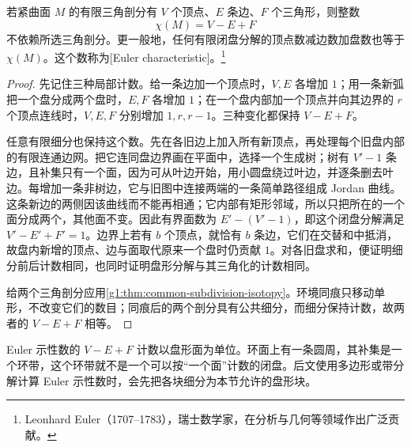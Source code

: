 \begin{proposition}\label{g1:prop:euler-triangulation-independent}
	若紧曲面 \(M\) 的有限三角剖分有 \(V\) 个顶点、\(E\) 条边、\(F\) 个三角形，则整数
	\[
	\chi(M)=V-E+F
	\]
	不依赖所选三角剖分。更一般地，任何有限闭盘分解的顶点数减边数加盘数也等于 \(\chi(M)\)。这个数称为[Euler characteristic]。\footnote{Leonhard Euler（1707--1783），瑞士数学家，在分析与几何等领域作出广泛贡献。}
\end{proposition}

\begin{proof}
	先记住三种局部计数。给一条边加一个顶点时，\(V,E\) 各增加 \(1\)；用一条新弧把一个盘分成两个盘时，\(E,F\) 各增加 \(1\)；在一个盘内部加一个顶点并向其边界的 \(r\) 个顶点连线时，\(V,E,F\) 分别增加 \(1,r,r-1\)。三种变化都保持 \(V-E+F\)。

	任意有限细分也保持这个数。先在各旧边上加入所有新顶点，再处理每个旧盘内部的有限连通边网。把它连同盘边界画在平面中，选择一个生成树；树有 \(V'-1\) 条边，且补集只有一个面，因为可从叶边开始，用小圆盘绕过叶边，并逐条删去叶边。每增加一条非树边，它与旧图中连接两端的一条简单路径组成 Jordan 曲线。这条新边的两侧因该曲线而不能再相通；它内部有矩形邻域，所以只把所在的一个面分成两个，其他面不变。因此有界面数为 \(E'-(V'-1)\)，即这个闭盘分解满足 \(V'-E'+F'=1\)。边界上若有 \(b\) 个顶点，就恰有 \(b\) 条边，它们在交替和中抵消，故盘内新增的顶点、边与面取代原来一个盘时仍贡献 \(1\)。对各旧盘求和，便证明细分前后计数相同，也同时证明盘形分解与其三角化的计数相同。

	给两个三角剖分应用\cref{g1:thm:common-subdivision-isotopy}。环境同痕只移动单形，不改变它们的数目；同痕后的两个剖分具有公共细分，而细分保持计数，故两者的 \(V-E+F\) 相等。
\end{proof}

Euler 示性数的 \(V-E+F\) 计数以盘形面为单位。环面上有一条圆周，其补集是一个环带，这个环带就不是一个可以按“一个面”计数的闭盘。后文使用多边形或带分解计算 Euler 示性数时，会先把各块细分为本节允许的盘形块。
